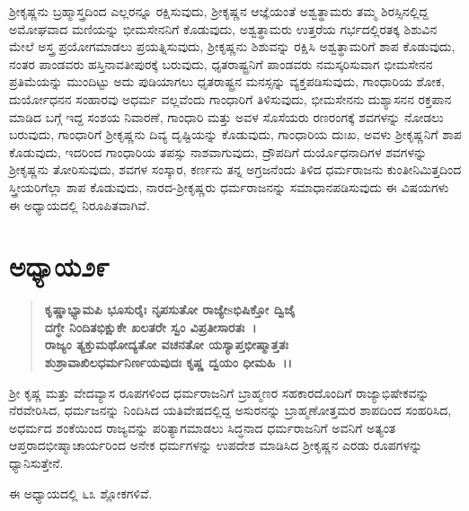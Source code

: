 ಶ‍್ರೀಕೃಷ್ಣನು ಬ್ರಹ್ಮಾಸ್ತ್ರದಿಂದ ಎಲ್ಲರನ್ನೂ ರಕ್ಷಿಸುವುದು, ಶ‍್ರೀಕೃಷ್ಣನ ಆಜ್ಞೆಯಂತೆ ಅಶ್ವತ್ಥಾಮರು ತಮ್ಮ ಶಿರಸ್ಸಿನಲ್ಲಿದ್ದ ಅಮೋಘವಾದ ಮಣಿಯನ್ನು ಭೀಮಸೇನನಿಗೆ ಕೊಡುವುದು, ಅಶ್ವತ್ಥಾಮರು ಉತ್ತರೆಯ ಗರ್ಭದಲ್ಲಿರತಕ್ಕ ಶಿಶುವಿನ ಮೇಲೆ ಅಸ್ತ್ರ ಪ್ರಯೋಗಮಾಡಲು ಪ್ರಯತ್ನಿಸುವುದು, ಶ‍್ರೀಕೃಷ್ಣನು ಶಿಶುವನ್ನು ರಕ್ಷಿಸಿ ಅಶ್ವತ್ಥಾಮರಿಗೆ ಶಾಪ ಕೊಡುವುದು, ನಂತರ ಪಾಂಡವರು ಹಸ್ತಿನಾವತೀಪುರಕ್ಕೆ ಬರುವುದು, ಧೃತರಾಷ್ಟ್ರನಿಗೆ ಪಾಂಡವರು ನಮಸ್ಕರಿಸುವಾಗ ಭೀಮಸೇನನ ಪ್ರತಿಮೆಯನ್ನು ಮುಂದಿಟ್ಟು ಅದು ಪುಡಿಯಾಗಲು ಧೃತರಾಷ್ಟ್ರನ ಮನಸ್ಸನ್ನು ವ್ಯಕ್ತಪಡಿಸುವುದು, ಗಾಂಧಾರಿಯ ಶೋಕ, ದುರ್ಯೋಧನನ ಸಂಹಾರವು ಅಧರ್ಮ ವಲ್ಲವೆಂದು ಗಾಂಧಾರಿಗೆ ತಿಳಿಸುವುದು, ಭೀಮಸೇನನು ದುಶ್ಯಾಸನನ ರಕ್ತಪಾನ ಮಾಡಿದ ಬಗ್ಗೆ ಇದ್ದ ಸಂಶಯ ನಿವಾರಣೆ, ಗಾಂಧಾರಿ ಮತ್ತು ಅವಳ ಸೊಸೆಯರು ರಣರಂಗಕ್ಕೆ ಶವಗಳನ್ನು ನೋಡಲು ಬರುವುದು, ಗಾಂಧಾರಿಗೆ ಶ‍್ರೀಕೃಷ್ಣನು ದಿವ್ಯ ದೃಷ್ಟಿಯನ್ನು ಕೊಡುವುದು, ಗಾಂಧಾರಿಯ ದುಃಖ, ಅವಳು ಶ‍್ರೀಕೃಷ್ಣನಿಗೆ ಶಾಪ ಕೊಡುವುದು, ಇದರಿಂದ ಗಾಂಧಾರಿಯ ತಪಸ್ಸು ನಾಶವಾಗುವುದು, ದ್ರೌಪದಿಗೆ ದುರ್ಯೊಧನಾದಿಗಳ ಶವಗಳನ್ನು ಶ‍್ರೀಕೃಷ್ಣನು ತೋರಿಸುವುದು, ಶವಗಳ ಸಂಸ್ಕಾರ, ಕರ್ಣನು ತನ್ನ ಅಗ್ರಜನೆಂದು ತಿಳಿದ ಧರ್ಮರಾಜನು ಕುಂತೀನಿಮಿತ್ತದಿಂದ ಸ್ತ್ರೀಯರಿಗೆಲ್ಲಾ ಶಾಪ ಕೊಡುವುದು, ನಾರದ-ಶ‍್ರೀಕೃಷ್ಣರು ಧರ್ಮರಾಜನನ್ನು ಸಮಾಧಾನಪಡಿಸುವುದು ಈ ವಿಷಯಗಳು ಈ ಅಧ್ಯಾಯದಲ್ಲಿ ನಿರೂಪಿತವಾಗಿವೆ.


\section*{ಅಧ್ಯಾಯ\enginline{-}೨೯}

\begin{verse}
\textbf{ಕೃಷ್ಣಾಭ್ಯಾಮಪಿ ಭೂಸುರೈಃ ನೃಪಸುತೋ ರಾಜ್ಯೇsಭಿಷಿಕ್ತೋ ದ್ವಿಜೈ}\\\textbf{ದಗ್ಧೇ ನಿಂದಿತಭಿಕ್ಷುಕೇ ಖಲತರೇ ಸ್ವಂ ವಿಪ್ರತೀಸಾರತಃ~।}\\\textbf{ ರಾಜ್ಯಂ ತ್ಯಕ್ತುಮಥೋದ್ಯತೋ ವಚನತೋ ಯಸ್ಯಾಪ್ತಭೀಷ್ಮಾತ್ತತಃ }\\\textbf{ಶುಶ್ರಾವಾಖಿಲಧರ್ಮನಿರ್ಣಯವುದಃ ಕೃಷ್ಣ ದ್ವಯಂ ಧೀಮಹಿ~।।}
\end{verse}

ಶ‍್ರೀ ಕೃಷ್ಣ ಮತ್ತು ವೇದವ್ಯಾಸ ರೂಪಗಳಿಂದ ಧರ್ಮರಾಜನಿಗೆ ಬ್ರಾಹ್ಮಣರ ಸಹಕಾರ\-ದೊಂದಿಗೆ ರಾಜ್ಯಾಭಿಷೇಕವನ್ನು ನೆರವೇರಿಸಿದ, ಧರ್ಮಜನನ್ನು ನಿಂದಿಸಿದ ಯತಿವೇಷದಲ್ಲಿದ್ದ ಅಸುರನನ್ನು ಬ್ರಾಹ್ಮಣೋತ್ತಮರ ಶಾಪದಿಂದ ಸಂಹರಿಸಿದ, ಅಧರ್ಮದ ಶಂಕೆಯಿಂದ ರಾಜ್ಯವನ್ನು ಪರಿತ್ಯಾಗಮಾಡಲು ಸಿದ್ಧನಾದ ಧರ್ಮರಾಜನಿಗೆ ಅವನಿಗೆ ಅತ್ಯಂತ ಆಪ್ತರಾದ\break ಭೀಷ್ಮಾಚಾರ್ಯರಿಂದ ಅನೇಕ ಧರ್ಮಗಳನ್ನು ಉಪದೇಶ ಮಾಡಿಸಿದ ಶ‍್ರೀಕೃಷ್ಣನ ಎರಡು ರೂಪಗಳನ್ನು ಧ್ಯಾನಿಸುತ್ತೇನೆ.

ಈ ಅಧ್ಯಾಯದಲ್ಲಿ ೬೩ ಶ್ಲೋಕಗಳಿವೆ.


